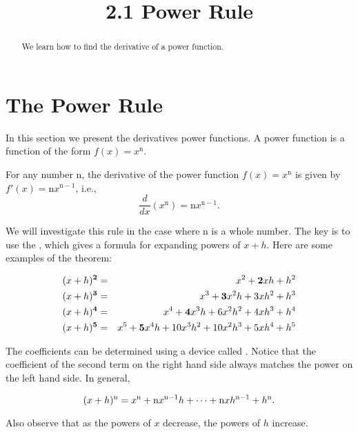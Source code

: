 \documentclass{ximera}
\title{2.1 Power Rule}
\begin{document}
\begin{abstract}
We learn how to find the derivative of a power function.
\end{abstract}

\maketitle


\section{The Power Rule}

In this section we present the derivatives power functions. A power function is a function of the form $f(x) = x^\text{n}$.  

\begin{theorem}
For any number n, the derivative of the power function $f(x) = x^\text{n}$ is given by
$f'(x) = \text{n}x^{\text{n} -1}$, i.e.,
\[\frac{d}{dx} \left(x^\text{n}\right) = \text{n}x^{\text{n}-1}.\]
\end{theorem}

We will investigate this rule in the case where n is a whole number. The key is to use 
the , which gives a formula for 
expanding powers of $x+h$. 
Here are some examples of the theorem:

\begin{eqnarray*}
(x+h)^{\bf 2} &=&x^2 + {\bf 2}xh + h^2\\
(x+h)^{\bf 3} &=& x^3 + {\bf 3}x^2h + 3xh^2 + h^3\\
(x+h)^{\bf 4} &=& x^4 + {\bf 4}x^3h+ 6x^2h^2 + 4xh^3 + h^4\\
(x+h)^{\bf 5} &=& x^5 + {\bf 5}x^4h + 10x^3h^2 + 10x^2h^3 + 5xh^4 + h^5
\end{eqnarray*}

The coefficients can be  determined using a device called .
Notice that the coefficient of the second term on the right hand side always matches the power on the left hand side. In general,

\[(x+h)^{\bf \text{n}} = x^\text{n} + {\bf \text{n}}x^{\text{n}-1}h + \dots + \text{n}xh^{\text{n}-1} + h^\text{n}.\]

Also observe that as the powers of $x$ decrease, the powers of $h$ increase.\\
\end{document}
